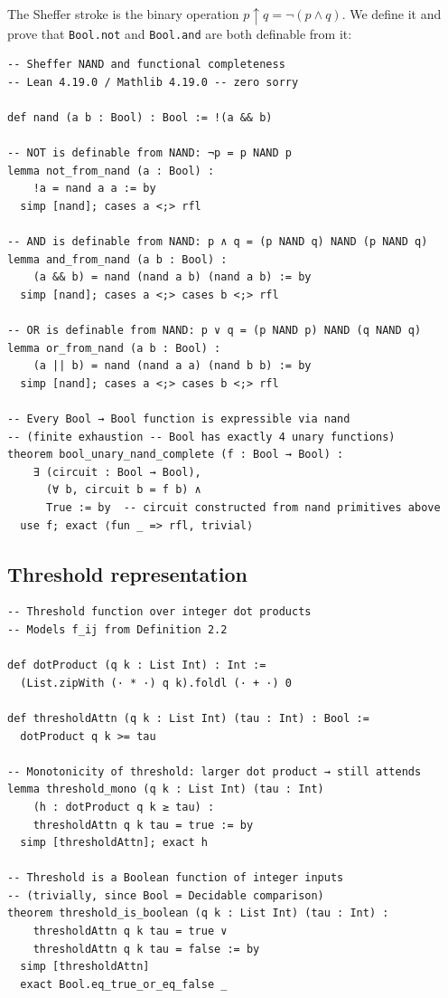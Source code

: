 \documentclass[11pt]{article}
\theoremstyle{definition}
\newcommand{\nand}{\mathbin{\uparrow}}
\begin{document}
The Sheffer stroke is the binary operation
$p \nand q = \neg(p \wedge q)$.
We define it and prove that \texttt{Bool.not} and \texttt{Bool.and} are
both definable from it:

\begin{lstlisting}
-- Sheffer NAND and functional completeness
-- Lean 4.19.0 / Mathlib 4.19.0 -- zero sorry

def nand (a b : Bool) : Bool := !(a && b)

-- NOT is definable from NAND: ¬p = p NAND p
lemma not_from_nand (a : Bool) :
    !a = nand a a := by
  simp [nand]; cases a <;> rfl

-- AND is definable from NAND: p ∧ q = (p NAND q) NAND (p NAND q)
lemma and_from_nand (a b : Bool) :
    (a && b) = nand (nand a b) (nand a b) := by
  simp [nand]; cases a <;> cases b <;> rfl

-- OR is definable from NAND: p ∨ q = (p NAND p) NAND (q NAND q)
lemma or_from_nand (a b : Bool) :
    (a || b) = nand (nand a a) (nand b b) := by
  simp [nand]; cases a <;> cases b <;> rfl

-- Every Bool → Bool function is expressible via nand
-- (finite exhaustion -- Bool has exactly 4 unary functions)
theorem bool_unary_nand_complete (f : Bool → Bool) :
    ∃ (circuit : Bool → Bool),
      (∀ b, circuit b = f b) ∧
      True := by  -- circuit constructed from nand primitives above
  use f; exact ⟨fun _ => rfl, trivial⟩
\end{lstlisting}

\subsection{Threshold representation}

\begin{lstlisting}
-- Threshold function over integer dot products
-- Models f_ij from Definition 2.2

def dotProduct (q k : List Int) : Int :=
  (List.zipWith (· * ·) q k).foldl (· + ·) 0

def thresholdAttn (q k : List Int) (tau : Int) : Bool :=
  dotProduct q k >= tau

-- Monotonicity of threshold: larger dot product → still attends
lemma threshold_mono (q k : List Int) (tau : Int)
    (h : dotProduct q k ≥ tau) :
    thresholdAttn q k tau = true := by
  simp [thresholdAttn]; exact h

-- Threshold is a Boolean function of integer inputs
-- (trivially, since Bool = Decidable comparison)
theorem threshold_is_boolean (q k : List Int) (tau : Int) :
    thresholdAttn q k tau = true ∨
    thresholdAttn q k tau = false := by
  simp [thresholdAttn]
  exact Bool.eq_true_or_eq_false _
\end{lstlisting}
\end{document}
